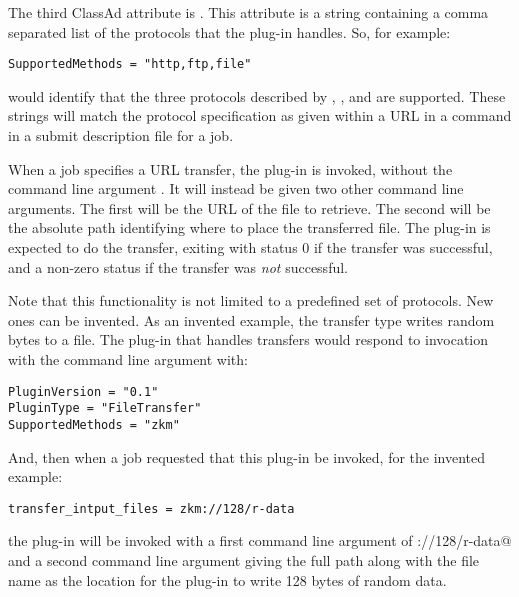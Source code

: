The third ClassAd attribute is . 
This attribute is a string containing a comma separated list of the
protocols that the plug-in handles.
So, for example:
\footnotesize
\begin{verbatim}
SupportedMethods = "http,ftp,file"
\end{verbatim}
\normalsize
would identify that the three protocols described by \verb@http@,
\verb@ftp@, and \verb@ftp@ are supported.
These strings will match the protocol specification as given
within a URL in a  command 
in a submit description file for a job.

When a job specifies a URL transfer,
the plug-in is invoked, without the command line argument .
It will instead be given two other command line arguments.
The first will be the URL of the file to retrieve.
The second will be the absolute path identifying where to place the
transferred file.
The plug-in is expected to do the transfer,
exiting with status 0 if the transfer was successful, 
and a non-zero status if the transfer was \emph{not} successful.

Note that this functionality is not limited to a predefined set
of protocols.
New ones can be invented.
As an invented example,
the \verb@zkm@ transfer type writes random bytes to a file.
The plug-in that handles \verb@zkm@ transfers would respond to 
invocation with the  command line argument with:
\footnotesize
\begin{verbatim}
PluginVersion = "0.1"
PluginType = "FileTransfer"
SupportedMethods = "zkm"
\end{verbatim}
\normalsize
And, then when a job requested that this plug-in be invoked,
for the invented example:
\footnotesize
\begin{verbatim}
transfer_intput_files = zkm://128/r-data
\end{verbatim}
\normalsize
the plug-in will be invoked with a first command line argument
of \verb@zkm://128/r-data@ and a second command line argument giving
the full path along with the file name  as the location
for the plug-in to write 128 bytes of random data.
